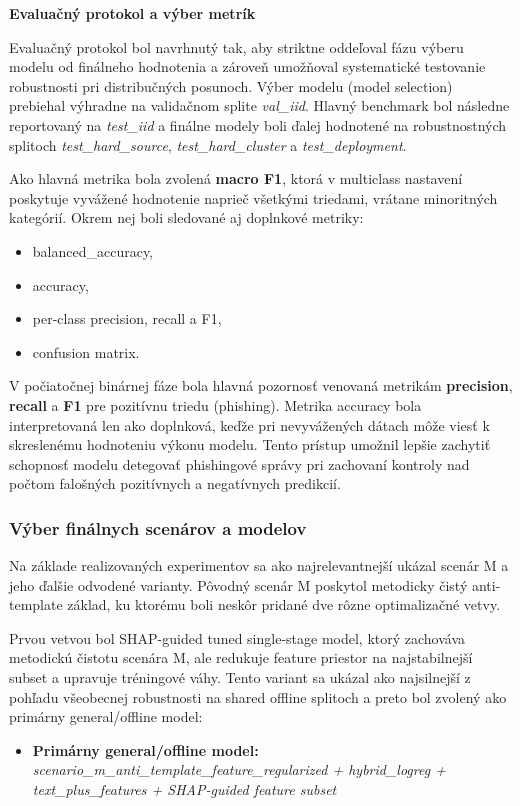 \documentclass[conference]{IEEEtran}
\begin{document}
\textbf{Evaluačný protokol a výber metrík}

Evaluačný protokol bol navrhnutý tak, aby striktne oddeľoval fázu výberu modelu od finálneho hodnotenia a zároveň umožňoval systematické testovanie robustnosti pri distribučných posunoch. Výber modelu (model selection) prebiehal výhradne na validačnom splite \textit{val\_iid}. Hlavný benchmark bol následne reportovaný na \textit{test\_iid} a finálne modely boli ďalej hodnotené na robustnostných splitoch \textit{test\_hard\_source}, \textit{test\_hard\_cluster} a \textit{test\_deployment}.

Ako hlavná metrika bola zvolená \textbf{macro F1}, ktorá v multiclass nastavení poskytuje vyvážené hodnotenie naprieč všetkými triedami, vrátane minoritných kategórií. Okrem nej boli sledované aj doplnkové metriky:

\begin{itemize}
    \item balanced\_accuracy,
    \item accuracy,
    \item per-class precision, recall a F1,
    \item confusion matrix.
\end{itemize}

V počiatočnej binárnej fáze bola hlavná pozornosť venovaná metrikám \textbf{precision}, \textbf{recall} a \textbf{F1} pre pozitívnu triedu (phishing). Metrika accuracy bola interpretovaná len ako doplnková, keďže pri nevyvážených dátach môže viesť k skreslenému hodnoteniu výkonu modelu. Tento prístup umožnil lepšie zachytiť schopnosť modelu detegovať phishingové správy pri zachovaní kontroly nad počtom falošných pozitívnych a negatívnych predikcií.

\subsubsection{Výber finálnych scenárov a modelov}

Na základe realizovaných experimentov sa ako najrelevantnejší ukázal scenár M a jeho ďalšie odvodené varianty. Pôvodný scenár M poskytol metodicky čistý anti-template základ, ku ktorému boli neskôr pridané dve rôzne optimalizačné vetvy.

Prvou vetvou bol SHAP-guided tuned single-stage model, ktorý zachováva metodickú čistotu scenára M, ale redukuje feature priestor na najstabilnejší subset a upravuje tréningové váhy. Tento variant sa ukázal ako najsilnejší z pohľadu všeobecnej robustnosti na shared offline splitoch a preto bol zvolený ako primárny general/offline model:
\begin{itemize}
    \item \textbf{Primárny general/offline model:} \\
    \textit{scenario\_m\_anti\_template\_feature\_regularized + hybrid\_logreg + text\_plus\_features + SHAP-guided feature subset}
\end{itemize}
\end{document}
